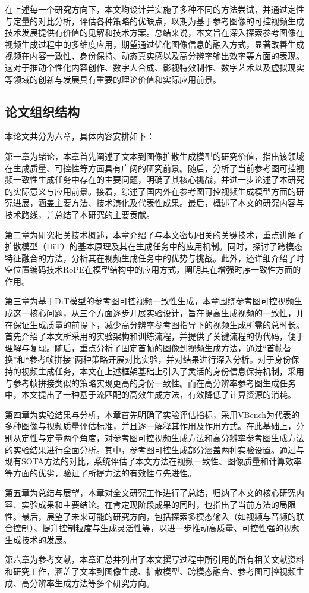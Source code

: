在上述每一个研究方向下，本文均设计并实施了多种不同的方法尝试，并通过定性与定量的对比分析，评估各种策略的优缺点，以期为基于参考图像的可控视频生成技术发展提供有价值的见解和技术方案。总结来说，本文旨在深入探索参考图像在视频生成过程中的多维度应用，期望通过优化图像信息的融入方式，显著改善生成视频在内容一致性、身份保持、动态真实感以及高分辨率输出效率等方面的表现。这对于推动个性化内容创作、数字人合成、影视特效制作、数字艺术以及虚拟现实等领域的创新与发展具有重要的理论价值和实际应用前景。
\subsection{论文组织结构}
本论文共分为六章，具体内容安排如下：

第一章为绪论，本章首先阐述了文本到图像扩散生成模型的研究价值，指出该领域在生成质量、可控性等方面具有广阔的研究前景。随后，分析了当前参考图可控视频一致性生成任务中存在的主要问题，明确了其核心挑战，并进一步论述了本研究的实际意义与应用前景。接着，综述了国内外在参考图可控视频生成模型方面的研究进展，涵盖主要方法、技术演化及代表性成果。最后，概述了本文的研究内容与技术路线，并总结了本研究的主要贡献。

第二章为研究相关技术概述，本章介绍了与本文密切相关的关键技术，重点讲解了扩散模型（DiT）的基本原理及其在生成任务中的应用机制。同时，探讨了跨模态特征融合的方法，分析其在视频生成任务中的优势与挑战。此外，还详细介绍了时空位置编码技术RoPE在模型结构中的应用方式，阐明其在增强时序一致性方面的作用。

第三章为基于DiT模型的参考图可控视频一致性生成，本章围绕参考图可控视频生成这一核心问题，从三个方面逐步开展实验设计，旨在提高生成视频的一致性，并在保证生成质量的前提下，减少高分辨率参考图指导下的视频生成所需的总时长。首先介绍了本文所采用的实验架构和训练流程，并提供了关键流程的伪代码，便于理解与复现。随后，重点分析了固定首帧的图像到视频生成方法，通过“首帧替换”和“参考帧拼接”两种策略开展对比实验，并对结果进行深入分析。对于身份保持的视频生成任务，本文在上述框架基础上引入了灵活的身份信息保持机制，采用与参考帧拼接类似的策略实现更高的身份一致性。而在高分辨率参考图生成任务中，本文提出了一种基于流匹配的高效生成方法，有效降低了计算资源的消耗。

第四章为实验结果与分析，本章首先明确了实验评估指标，采用VBench为代表的多种图像与视频质量评估标准，并且逐一解释其作用及作用方式。在此基础上，分别从定性与定量两个角度，对参考图可控视频生成方法和高分辨率参考图生成方法的实验结果进行全面分析。其中，参考图可控生成部分涵盖两种实验设置。通过与现有SOTA方法的对比，系统评估了本文方法在视频一致性、图像质量和计算效率等方面的优劣，验证了所提方法的有效性与先进性。

第五章为总结与展望，本章对全文研究工作进行了总结，归纳了本文的核心研究内容、实验成果和主要结论。在肯定现阶段成果的同时，也指出了当前方法的局限性。最后，展望了未来可能的研究方向，包括探索多模态输入（如视频与音频的联合控制）、提升控制粒度与生成灵活性等，以进一步推动高质量、可控性强的视频生成技术的发展。

第六章为参考文献，本章汇总并列出了本文撰写过程中所引用的所有相关文献资料和研究工作，涵盖了文本到图像生成、扩散模型、跨模态融合、参考图可控视频生成、高分辨率生成方法等多个研究方向。
